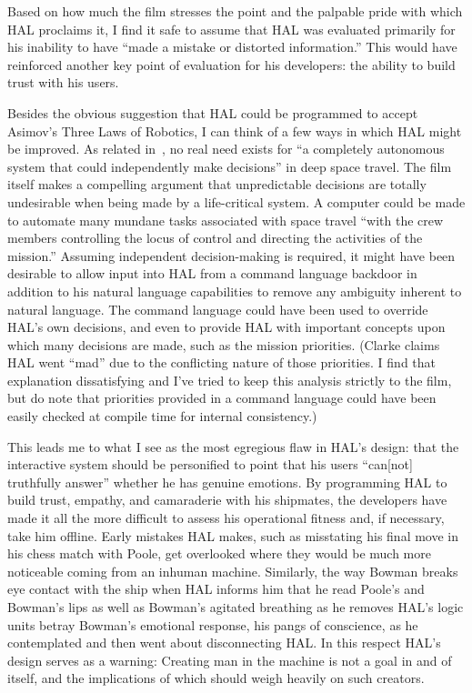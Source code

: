 \documentclass{abrice}
\begin{document}
Based on how much the film stresses the point and the palpable pride with which
HAL proclaims it, I find it safe to assume that HAL was evaluated primarily
for his inability to have ``made a mistake or distorted information.'' This
would have reinforced another key point of evaluation for his developers: the
ability to build trust with his users.

Besides the obvious suggestion that HAL could be programmed to accept Asimov's
Three Laws of Robotics, I can think of a few ways in which HAL might be
improved. As related in~\cite{korsmeyer}, no real need exists for ``a completely
autonomous system that could independently make decisions'' in deep space
travel. The film itself makes a compelling argument that unpredictable decisions
are totally undesirable when being made by a life-critical system. A computer
could be made to automate many mundane tasks associated with space travel ``with
the crew members controlling the locus of control and directing the activities
of the mission.'' Assuming independent decision-making is required, it might
have been desirable to allow input into HAL from a command language backdoor in
addition to his natural language capabilities to remove any ambiguity inherent
to natural language. The command language could have been used to override HAL's
own decisions, and even to provide HAL with important concepts upon which many
decisions are made, such as the mission priorities. (Clarke claims HAL went
``mad'' due to the conflicting nature of those priorities. I find that
explanation dissatisfying and I've tried to keep this analysis strictly to the
film, but do note that priorities provided in a command language could have been
easily checked at compile time for internal consistency.)

This leads me to what I see as the most egregious flaw in HAL's design: that the
interactive system should be personified to point that his users ``can[not]
truthfully answer'' whether he has genuine emotions. By programming HAL to build
trust, empathy, and camaraderie with his shipmates, the developers have made it
all the more difficult to assess his operational fitness and, if necessary, take
him offline. Early mistakes HAL makes, such as misstating his final move in his
chess match with Poole, get overlooked where they would be much more noticeable
coming from an inhuman machine. Similarly, the way Bowman breaks eye contact with
the ship when HAL informs him that he read Poole's and Bowman's lips as well as
Bowman's agitated breathing as he removes HAL's logic units betray Bowman's
emotional response, his pangs of conscience, as he contemplated and then went
about disconnecting HAL\@. In this respect HAL's design serves as a warning:
Creating man in the machine is not a goal in and of itself, and the implications of
which should weigh heavily on such creators.

\printbibliography%
\end{document}
